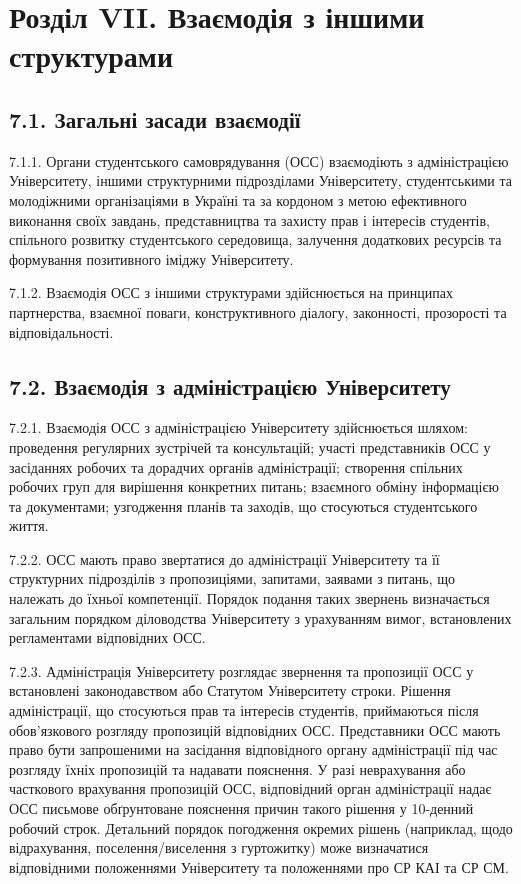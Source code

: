 \section*{Розділ VII. Взаємодія з іншими структурами}

\subsection*{7.1. Загальні засади взаємодії}
    7.1.1. Органи студентського самоврядування (ОСС) взаємодіють з адміністрацією Університету, іншими структурними підрозділами Університету, студентськими та молодіжними організаціями в Україні та за кордоном з метою ефективного виконання своїх завдань, представництва та захисту прав і інтересів студентів, спільного розвитку студентського середовища, залучення додаткових ресурсів та формування позитивного іміджу Університету.

    7.1.2. Взаємодія ОСС з іншими структурами здійснюється на принципах партнерства, взаємної поваги, конструктивного діалогу, законності, прозорості та відповідальності.

\subsection*{7.2. Взаємодія з адміністрацією Університету}
    7.2.1. Взаємодія ОСС з адміністрацією Університету здійснюється шляхом: проведення регулярних зустрічей та консультацій; участі представників ОСС у засіданнях робочих та дорадчих органів адміністрації; створення спільних робочих груп для вирішення конкретних питань; взаємного обміну інформацією та документами; узгодження планів та заходів, що стосуються студентського життя.

    7.2.2. ОСС мають право звертатися до адміністрації Університету та її структурних підрозділів з пропозиціями, запитами, заявами з питань, що належать до їхньої компетенції. Порядок подання таких звернень визначається загальним порядком діловодства Університету з урахуванням вимог, встановлених регламентами відповідних ОСС.

    7.2.3. Адміністрація Університету розглядає звернення та пропозиції ОСС у встановлені законодавством або Статутом Університету строки. Рішення адміністрації, що стосуються прав та інтересів студентів, приймаються після обов'язкового розгляду пропозицій відповідних ОСС. Представники ОСС мають право бути запрошеними на засідання відповідного органу адміністрації під час розгляду їхніх пропозицій та надавати пояснення. У разі неврахування або часткового врахування пропозицій ОСС, відповідний орган адміністрації надає ОСС письмове обґрунтоване пояснення причин такого рішення у 10-денний робочий строк. Детальний порядок погодження окремих рішень (наприклад, щодо відрахування, поселення/виселення з гуртожитку) може визначатися відповідними положеннями Університету та положеннями про СР КАІ та СР СМ.


